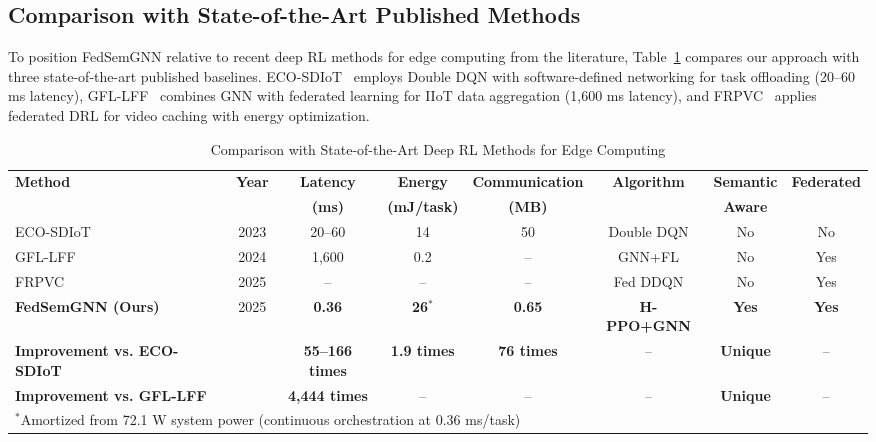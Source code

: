\documentclass[conference]{IEEEtran}
\begin{document}
	\subsection{Comparison with State-of-the-Art Published Methods}
	
	To position FedSemGNN relative to recent deep RL methods for edge computing from the literature, Table~\ref{tab:sota_comparison} compares our approach with three state-of-the-art published baselines. ECO-SDIoT~\cite{zhu2023eco} employs Double DQN with software-defined networking for task offloading (20--60 ms latency), GFL-LFF~\cite{regan2024gfl} combines GNN with federated learning for IIoT data aggregation (1,600 ms latency), and FRPVC~\cite{qian2025frpvc} applies federated DRL for video caching with energy optimization.
	
	\begin{table}[htbp]
		\centering
		\caption{Comparison with State-of-the-Art Deep RL Methods for Edge Computing}
		\label{tab:sota_comparison}
		\small
		\begin{tabular}{lccccccc}
			\toprule
			\textbf{Method} & \textbf{Year} & \textbf{Latency} & \textbf{Energy} & \textbf{Communication} & \textbf{Algorithm} & \textbf{Semantic} & \textbf{Federated} \\
			& & \textbf{(ms)} & \textbf{(mJ/task)} & \textbf{(MB)} & & \textbf{Aware} & \\
			\midrule
			ECO-SDIoT~\cite{zhu2023eco} & 2023 & 20--60 & 14 & 50 & Double DQN & No & No \\
			GFL-LFF~\cite{regan2024gfl} & 2024 & 1,600 & 0.2 & -- & GNN+FL & No & Yes \\
			FRPVC~\cite{qian2025frpvc} & 2025 & -- & -- & -- & Fed DDQN & No & Yes \\
			\midrule
			\textbf{FedSemGNN (Ours)} & 2025 & \textbf{0.36} & \textbf{26}$^*$ & \textbf{0.65} & \textbf{H-PPO+GNN} & \textbf{Yes} & \textbf{Yes} \\
			\midrule
			\textbf{Improvement vs. ECO-SDIoT} & & \textbf{55--166 times} & \textbf{1.9 times} & \textbf{76 times} & -- & \textbf{Unique} & -- \\
			\textbf{Improvement vs. GFL-LFF} & & \textbf{4,444 times} & -- & -- & -- & \textbf{Unique} & -- \\
			\bottomrule
			\multicolumn{8}{l}{\footnotesize $^*$Amortized from 72.1 W system power (continuous orchestration at 0.36 ms/task)}\\
		\end{tabular}
	\end{table}
	
\end{document}
